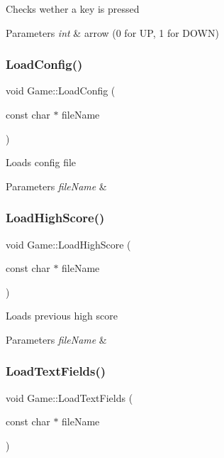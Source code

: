 Checks wether a key is pressed 
\begin{DoxyParams}{Parameters}
{\em int} & arrow (0 for UP, 1 for D\+O\+WN) \\
\hline
\end{DoxyParams}
\mbox{\label{class_game_ac23a2dbd9c1a1a22bf1e8a6d36d93653}} 
\subsubsection{\texorpdfstring{Load\+Config()}{LoadConfig()}}
{\footnotesize\ttfamily void Game\+::\+Load\+Config (\begin{DoxyParamCaption}\item[{const char $\ast$}]{file\+Name }\end{DoxyParamCaption})}

Loads config file 
\begin{DoxyParams}{Parameters}
{\em file\+Name} & \\
\hline
\end{DoxyParams}
\mbox{\label{class_game_a120d03b55162ebdf60d5b3dbd8dba3c5}} 
\subsubsection{\texorpdfstring{Load\+High\+Score()}{LoadHighScore()}}
{\footnotesize\ttfamily void Game\+::\+Load\+High\+Score (\begin{DoxyParamCaption}\item[{const char $\ast$}]{file\+Name }\end{DoxyParamCaption})}

Loads previous high score 
\begin{DoxyParams}{Parameters}
{\em file\+Name} & \\
\hline
\end{DoxyParams}
\mbox{\label{class_game_a28b0ecbf20b95b6e910cd2b0a9581c69}} 
\subsubsection{\texorpdfstring{Load\+Text\+Fields()}{LoadTextFields()}}
{\footnotesize\ttfamily void Game\+::\+Load\+Text\+Fields (\begin{DoxyParamCaption}\item[{const char $\ast$}]{file\+Name }\end{DoxyParamCaption})}

